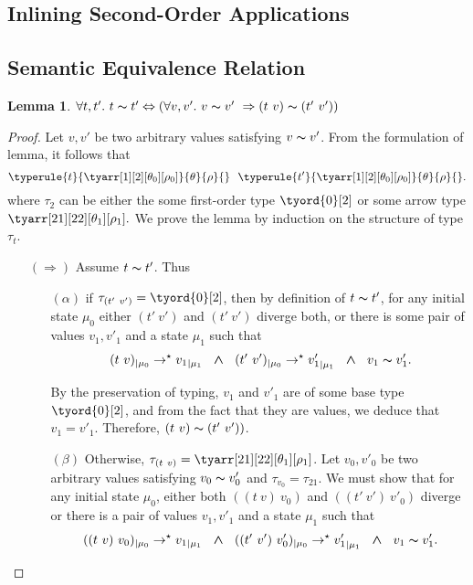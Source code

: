 \documentclass[a4paper,11pt,oneside]{article}
\theoremstyle{plain}
\newtheorem{lemma}[definition]{Lemma}
\newcommand{\tmapp}[2]{(#1 ~ #2)}
\newcommand{\ty}[1][]{\tau_{#1}}
\newcommand{\bwedge}{\boldsymbol{~\wedge~}}
\newcommand{\evalstar}[4]{~#1_{|\mu_#2} \rightarrow^{\star} #3_{|\mu_#4} ~}
\newcommand{\eqv}[1]{#1 \thicksim #1'}
\begin{document}
	
	
	\subsection{Inlining Second-Order Applications}



	\subsection{Semantic Equivalence Relation}
	\begin{lemma}
		$\forall t,t'.~ \eqv{t} \Leftrightarrow 
			(\forall v, v'.~\eqv{v}~\Rightarrow
			\tmapp{t}{v} \thicksim \tmapp{t'}{v'})$
	\label{equiv-def-p}
	\end{lemma}

	\begin{proof}
		Let $v, v'$ be two arbitrary values satisfying $\eqv{v}$.
		From the formulation of lemma, it follows that
		$$	\typerule{t}{\tyarr[1][2][\theta_0][\rho_0]}{\theta}{\rho}{} ~~ 
				\typerule{t'}{\tyarr[1][2][\theta_0][\rho_0]}{\theta}{\rho}{}.$$
		where $\ty[2]$ can be either the some first-order type $\tyord{0}[2]$ or
		some arrow type $\tyarr[21][22][\theta_1][\rho_1].$ 
		We prove the lemma by induction on the structure of type $\ty[t]$.
	\begin{itemize}		
	
		\item[$(\Rightarrow)$] Assume $\eqv{t}$. Thus 		
		
		\begin{itemize}
		
		\item[$(\alpha)$] if $\ty[\tmapp{t'}{v'}] = \tyord{0}[2]$, then
		by definition of $\eqv{t}$, for any initial state $\mu_0$ either 
		$\tmapp{t'}{v'}$ and $\tmapp{t'}{v'}$ diverge both, 
		or there is some pair of values $v_1, v'_1$ and a state $\mu_1$ such that 
		$$\evalstar{\tmapp{t}{v}}{0}{{v_1}}{1} 
			\bwedge \evalstar{\tmapp{t'}{v'}}{0}{{v'_1}}{1} \bwedge~\eqv{v_1}.$$
		
		By the preservation of typing, $v_1$ and $v'_1$ are of some base 
		type $\tyord{0}[2]$, and from the fact that they are values, we deduce
		that $v_1 = v'_1$. Therefore,  $\tmapp{t}{v} \thicksim \tmapp{t'}{v'})$.
			
		\item[$(\beta)$] Otherwise, 
		$\ty[\tmapp{t}{v}] = \tyarr[21][22][\theta_1][\rho_1]$.
		Let $v_0, v'_0$ be two arbitrary values satisfying $\eqv{v_0}$ and 
		$\ty[v_0] = \ty[21]$. We must show that for any initial state $\mu_0$,
		either both 
		$\tmapp{\tmapp{t}{v}}{v_0}$ and $\tmapp{\tmapp{t'}{v'}}{v'_0}$ diverge
		or there is a pair of values $v_1, v'_1$ and a state $\mu_1$ such that 
		$$\evalstar{\tmapp{\tmapp{t}{v}}{v_0}}{0}{{v_1}}{1} \bwedge
		\evalstar{\tmapp{\tmapp{t'}{v'}}{v'_0}}{0}{{v'_1}}{1} \bwedge~\eqv{v_1}.$$
		

\end{itemize}
\end{itemize}
\end{proof}
\end{document}
